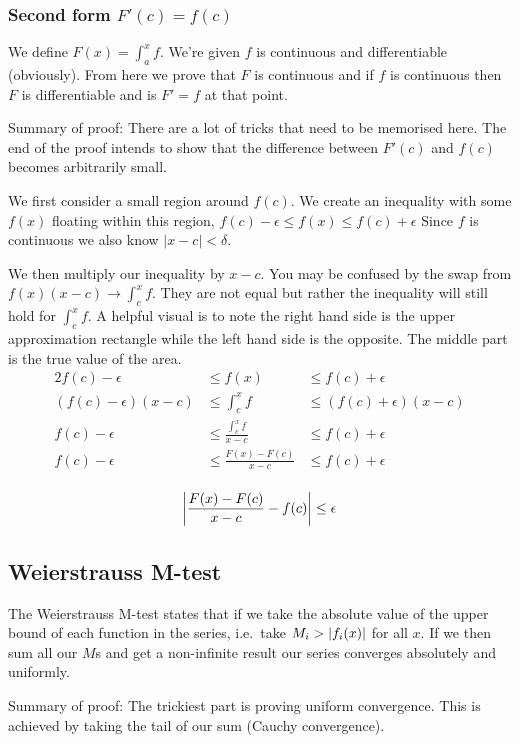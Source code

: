 \documentclass{article}
\DeclarePairedDelimiter{\abs}{\lvert}{\rvert}
\begin{document}
\subsubsection{Second form $F'(c) = f(c)$}
We define $F(x) = \int_a^x f$. We're given $f$ is continuous and differentiable
(obviously). From here we prove that $F$ is continuous and if $f$ is continuous
then $F$ is differentiable and is $F' = f$ at that point.

Summary of proof: There are a lot of tricks that need to be memorised here.
The end of the proof intends to show that the difference between $F'(c)$ and
$f(c)$ becomes arbitrarily small.

We first consider a small region around $f(c)$. We create an inequality
with some $f(x)$ floating within this region,
$f(c) - \epsilon \leq f(x) \leq f(c) + \epsilon$
Since $f$ is continuous we also know $|x - c| < \delta$.

We then multiply our inequality by $x - c$. You may be confused by the
swap from $f(x)(x-c) \to \int_c^x f$. They are not equal but rather
the inequality will still hold for $\int_c^x f$. A helpful visual is to note
the right hand side is the upper approximation rectangle while
the left hand side is the opposite. The middle part is the true value of the
area.
\begin{alignat*}{2}
    f(c) - \epsilon &\leq f(x) &\leq f(c) + \epsilon \\
    (f(c) - \epsilon)(x-c) &\leq \int_c^x f &\leq (f(c) + \epsilon)(x-c) \\
    f(c) - \epsilon &\leq \frac{\int_c^x f}{x-c} &\leq f(c) + \epsilon \\
    f(c) - \epsilon &\leq \frac{F(x) - F(c)}{x-c} &\leq f(c) + \epsilon \\
\end{alignat*}

\[
    \abs*{\frac{F(x) - F(c)}{x-c} - f(c)} \leq \epsilon
\]

\subsection{Weierstrauss M-test}
The Weierstrauss M-test states that if we take the absolute value of the upper
bound of each function in the series, i.e.\ take $M_i > \abs*{f_i(x)}$
for all $x$. If we then sum all our $M$s and get a non-infinite result
our series converges absolutely and uniformly.

Summary of proof: The trickiest part is proving uniform convergence. This is
achieved by taking the tail of our sum (Cauchy convergence).
\end{document}
